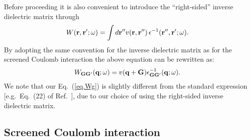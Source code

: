 \documentclass[twocolumn,prb,showpacs,superscriptaddress]{revtex4}
\def\w{\omega}
\def\q{{\bf q}}
\def\G{{\bf G}}
\def\Gp{{\bf G^\prime}}
\def\r{{\bf r}}
\def\rp{{\bf r^\prime}}
\def\rpp{{\bf r^{\prime\prime}}}
\begin{document}
Before proceeding it is also convenient to introduce the ``right-sided'' inverse dielectric matrix
through
  \begin{equation}
  W(\r,\rp;\w) = \int d\rpp v(\r,\rpp) \, \epsilon^{-1}(\rpp,\rp;\w).
  \end{equation}
By adopting the same convention for the inverse dielectric matrix
as for the screened Coulomb interaction 
the above equation can be rewritten as:
  \begin{equation}\label{eq.Wg}
  W_{\G\Gp}(\q;\w) = v(\q+\G)  \epsilon^{-1}_{\G\Gp}(\q;\w).
  \end{equation}
We note that our Eq.\ (\ref{eq.Wg}) is slightly different from the
standard expression [e.g.\ Eq.\ (22) of Ref.\ ], due
to our choice of using the right-sided inverse dielectric matrix.


%
%
%

\subsection{Screened Coulomb interaction}\label{sec.coulomb.g}
\end{document}
